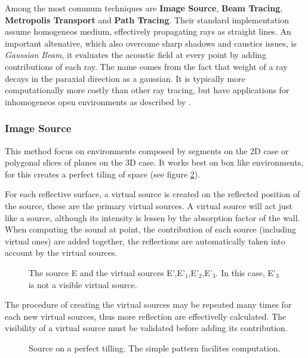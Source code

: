 Among the most commum techniques are \textbf{Image Source}, \textbf{Beam
Tracing}, \textbf{Metropolis Transport} and \textbf{Path Tracing}. Their
standard implementation assume homogeneos medium, effectively propagating rays
as straight lines. An important altenative, which also overcome sharp shadows
and caustics issues, is \textit{Gaussian Beam}, it evaluates the acoustic field
at every point by adding contributions of each ray. The name comes from the fact
that weight of a ray decays in the paraxial direction as a gaussian. It is
typically more computationally more costly than other ray tracing, but have
applications for inhomogeneos open environments as described by
\citet{traceroutdoor}.

\subsubsection{Image Source}

This method focus on environments composed by segments on the 2D case or
polygonal slices of planes on the 3D case. It works best on box like
environments, for this creates a perfect tiling of
space\cite{funkhouser2003survey} (see figure \ref{fig:tillingsource}).

For each reflective surface, a virtual source is created on the reflected
position of the source, these are the primary virtual sources. A virtual source
will act just like a source, although its intensity is lessen by the absorption
factor of the wall. When computing the sound at point, the
contribution of each source (including virtual ones) are added together, the
reflections are automatically taken into account by the virtual sources.

\begin{figure}[h]
	\centering
	
	\caption{The source E and the virtual sources E',E'$_1$,E'$_2$,E'$_3$. In this
	case, E'$_3$ is not a visible virtual source.}
	\label{fig:imagesource}
\end{figure}


The procedure of creating the virtual sources may be repeated many times for
each new virtual sources, thus more reflection are effectivelly calculated. The
visibility of a virtual source must be validated before adding its contribution.

\begin{figure}[h]
	\centering
	
	\caption{Source on a perfect tilling. The simple pattern facilites
	computation.}
	\label{fig:tillingsource}
\end{figure}

